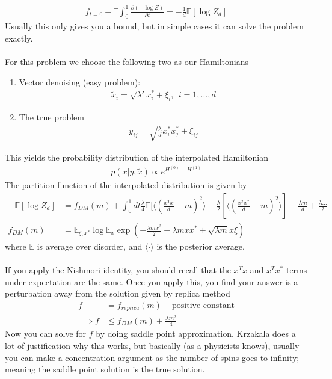 \begin{align}
	f_{t=0} + \mathbb E \int _0^1 \frac{\partial(- \log Z)}{\partial t} = - \frac{1}{d} \mathbb E[\log Z_d]
\end{align}
Usually this only gives you a bound, but in simple cases it can solve the problem exactly.\\
\\
For this problem we choose the following two as our Hamiltonians
\begin{enumerate}
	\item Vector denoising (easy problem): 
	\begin{align}
		\tilde x_i = \sqrt{\lambda '} x_i^* + \xi_i, ~~ i=1,...,d
	\end{align}
	\item The true problem
	\begin{align}
		y_{ij} = \sqrt{\frac{\lambda}{d}} x_i^* x_j^* + \xi_{ij}
	\end{align}
\end{enumerate}
This yields the probability distribution of the interpolated Hamiltonian
\begin{align}
	p(x | y, \tilde x) \propto e^{H^{(0)} + H^{(1)}}
\end{align}
The partition function of the interpolated distribution is given by
\begin{align}
	- \mathbb E[\log Z_d] & = f_{DM} (m) + \int_0^1 dt  \frac{\lambda}{4} \mathbb E[ \langle (\frac{x^T x}{d} - m)^2 \rangle - \frac{\lambda}{2} [ \langle ( \frac{x^T x^*}{d} - m )^2 \rangle] - \frac{\lambda m}{d} + \frac{\lambda ...}{2}\\
	f_{DM}(m) & = \mathbb E_{\xi, x^*} \log \mathbb E_{x} \exp \left( - \frac{\lambda m x^2}{2} + \lambda m x x^* + \sqrt{\lambda m } x\xi \right)
\end{align}
where $\mathbb E$ is average over disorder, and $\langle \cdot \rangle$ is the posterior average.\\
\\
If you apply the Nishmori identity, you should recall that the $x^T x$ and $x^T x^*$ terms under expectation are the same. Once you apply this, you find your answer is a perturbation away from the solution given by replica method
\begin{align}
	f & = f_{replica}(m) + \text{positive constant} \\
	\implies f & \leq  f_{DM}(m) + \frac{\lambda m^2}{4}
\end{align}
Now you can solve for $f$ by doing saddle point approximation. Krzakala does a lot of justification why this works, but basically (as a physicists knows), usually you can make a concentration argument as the number of spins goes to infinity; meaning the saddle point solution is the true solution.































